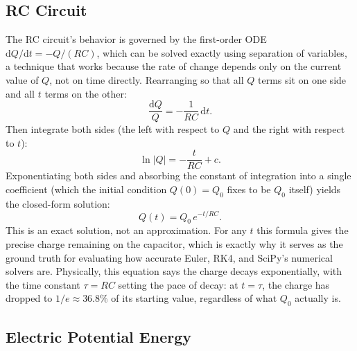 \documentclass[11pt]{article}
\newcommand{\dd}{\mathrm{d}}
\begin{document}
\subsection{RC Circuit}

The RC circuit's behavior is governed by the first-order ODE $\dd Q/\dd t = -Q/(RC)$, which can be solved exactly using separation of variables, a technique that works because the rate of change depends only on the current value of $Q$, not on time directly. Rearranging so that all $Q$ terms sit on one side and all $t$ terms on the other:
\begin{equation}
  \frac{\dd Q}{Q} = -\frac{1}{RC}\,\dd t.
\end{equation}
Then integrate both sides (the left with respect to $Q$ and the right with respect to $t$):
\begin{equation}
  \ln|Q| = -\frac{t}{RC} + c.
\end{equation}
Exponentiating both sides and absorbing the constant of integration into a single coefficient (which the initial condition $Q(0) = Q_0$ fixes to be $Q_0$ itself) yields the closed-form solution:
\begin{equation}
  Q(t) = Q_0\, e^{-t/RC}.
\end{equation}
This is an exact solution, not an approximation. For any $t$ this formula gives the precise charge remaining on the capacitor, which is exactly why it serves as the ground truth for evaluating how accurate Euler, RK4, and SciPy's numerical solvers are. Physically, this equation says the charge decays exponentially, with the time constant $\tau = RC$ setting the pace of decay: at $t = \tau$, the charge has dropped to $1/e \approx 36.8\%$ of its starting value, regardless of what $Q_0$ actually is.

\subsection{Electric Potential Energy}
\end{document}
